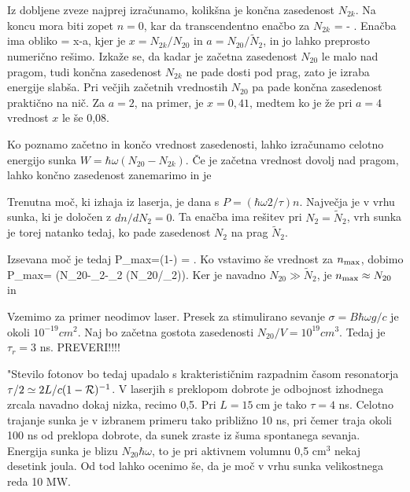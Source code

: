 Iz dobljene zveze najprej izračunamo, kolikšna je končna zasedenost $N_{2k}$. Na
koncu mora biti zopet $n=0$, kar da transcendentno enačbo za $N_{2k}$
\beq
\ln {} = - .
\eeq
Enačba ima obliko
\beq
\ln {}= x-a,
\eeq
kjer je $x=N_{2k}/N_{20}$ in $a=N_{20}/\tilde{N}_{2}$, in jo lahko preprosto
numerično rešimo. Izkaže se, da kadar je začetna zasedenost $N_{20}$
le malo nad pragom, tudi končna zasedenost $N_{2k}$ ne pade dosti pod prag, 
zato je izraba energije slabša. Pri večjih začetnih vrednostih $N_{20}$ pa 
pade končna zasedenost praktično na nič. Za $a=2$, na primer,
je $x=0,41$, medtem ko je že pri $a=4$ vrednost $x$ le še 0,08. 

Ko poznamo začetno in končo vrednost zasedenosti, lahko izračunamo 
celotno energijo sunka $W=\hbar \omega (N_{20}-N_{2k})$. Če je začetna vrednost
dovolj nad pragom, lahko končno zasedenost zanemarimo in je 

Trenutna moč, ki izhaja iz laserja, je dana s $P=(\hbar \omega 2/\tau )n$.
Največja je v vrhu sunka, ki je določen z $dn/dN_{2}=0$. Ta enačba ima
rešitev pri $N_{2}=\tilde{N}_{2}$, vrh sunka je torej natanko tedaj, ko
pade zasedenost $N_2$ na prag $\tilde{N}_2$. 

Izsevana moč je tedaj 
\beq
P_{\rm max}=\left(1-\right) = 
.
\eeq
Ko vstavimo še vrednost za $n_{\rm max}$, dobimo
\beq
P_{\rm max}=\frac {2\hbar \omega}{\tau} \left(N_{20}-_{2}-_{2}
\ln (N_{20}/_{2})\right).
\eeq
Ker je navadno $N_{20}\gg \tilde{N}_2$, je $n_{\rm max} \approx N_{20}$
in 

Vzemimo za primer neodimov laser. Presek za stimulirano sevanje 
$\sigma=B\hbar \omega g/c$ je okoli $10^{-19}\si{cm}^{2}$. 
Naj bo začetna gostota zasedenosti $N_{20}/V=10^{19}\si{cm}^3$. 
Tedaj je $\tau _{r}=3$ ns. 
PREVERI!!!!

"Stevilo fotonov bo tedaj upadalo s
krakterističnim razpadnim časom resonatorja $\tau /2\simeq 2L/c(1-{\cal R%
})^{-1}$. V laserjih s preklopom dobrote je odbojnost izhodnega zrcala
navadno dokaj nizka, recimo 0,5. Pri $L=15\;\mbox{cm}$ je tako $\tau =4$ ns.
Celotno trajanje sunka je v izbranem primeru tako približno 10 ns, pri
čemer traja okoli 100 ns od preklopa dobrote, da sunek zraste iz šuma
spontanega sevanja. Energija sunka je blizu $N_{20}\hbar \omega $, to je pri
aktivnem volumnu 0,5 cm$^{3}$ nekaj desetink joula. Od tod lahko ocenimo
še, da je moč v vrhu sunka velikostnega reda 10 MW.

